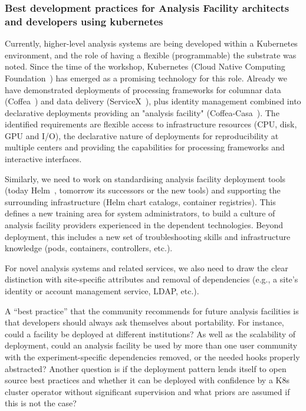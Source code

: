 \documentclass[a4paper,11pt]{article}
\begin{document}
\hypertarget{best-development-practices-for-analysis-facility-architects-and-developers-using-kubernetes}{%
\subsubsection{Best development practices for Analysis Facility
architects and developers using
kubernetes}\label{best-development-practices-for-analysis-facility-architects-and-developers-using-kubernetes}}

Currently, higher-level analysis systems are being developed within a
Kubernetes environment, and the role of having a flexible (programmable)
the substrate was noted. Since the time of the workshop, Kubernetes (Cloud
Native Computing Foundation~\cite{cncf}) has emerged as a promising technology for this role. Already we have demonstrated deployments of processing frameworks for columnar data
(Coffea~\cite{Smith:2020pxs}) and data delivery (ServiceX~\cite{galewsky2020servicex}), plus identity management combined
into declarative deployments providing an "analysis facility"
(Coffea-Casa~\cite{refId0-coffea-casa}). The identified requirements are flexible access to
infrastructure resources (CPU, disk, GPU and I/O), the declarative
nature of deployments for reproducibility at multiple centers and
providing the capabilities for processing frameworks and interactive
interfaces.

Similarly, we need to work on standardising analysis facility deployment
tools (today Helm~\cite{helm}, tomorrow its successors or the new tools) and
supporting the surrounding infrastructure (Helm chart catalogs,
container registries). This defines a new training area for system
administrators, to build a culture of analysis facility providers
experienced in the dependent technologies. Beyond deployment, this
includes a new set of troubleshooting skills and infrastructure
knowledge (pods, containers, controllers, etc.).

For novel analysis systems and related services, we also need to draw the
clear distinction with site-specific attributes and removal of
dependencies (e.g., a site's identity or account management service,
LDAP, etc.).

A ``best practice'' that the community recommends for future analysis
facilities is that developers should always ask themselves about
portability. For instance, could a facility be deployed at different
institutions? As well as the scalability of deployment, could an
analysis facility be used by more than one user community with the
experiment-specific dependencies removed, or the needed hooks properly
abstracted? Another question is if the deployment pattern lends itself
to open source best practices and whether it can be deployed with
confidence by a K8s cluster operator without significant supervision and
what priors are assumed if this is not the case?
\end{document}

